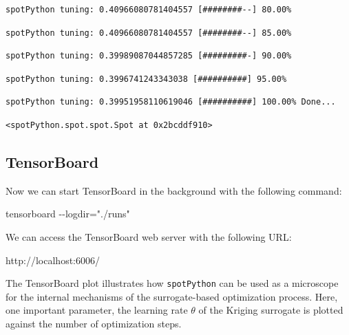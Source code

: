 \documentclass[
  letterpaper,
  DIV=11,
  numbers=noendperiod]{scrreprt}
\newenvironment{Shaded}{\begin{snugshade}}{\end{snugshade}}
\newcommand{\NormalTok}[1]{\textcolor[rgb]{0.00,0.23,0.31}{#1}}
\begin{document}
\begin{verbatim}
spotPython tuning: 0.40966080781404557 [########--] 80.00% 
\end{verbatim}

\begin{verbatim}
spotPython tuning: 0.40966080781404557 [########--] 85.00% 
\end{verbatim}

\begin{verbatim}
spotPython tuning: 0.39989087044857285 [#########-] 90.00% 
\end{verbatim}

\begin{verbatim}
spotPython tuning: 0.3996741243343038 [##########] 95.00% 
\end{verbatim}

\begin{verbatim}
spotPython tuning: 0.39951958110619046 [##########] 100.00% Done...
\end{verbatim}

\begin{verbatim}
<spotPython.spot.spot.Spot at 0x2bcddf910>
\end{verbatim}

\hypertarget{tensorboard-7}{%
\subsection{TensorBoard}\label{tensorboard-7}}

Now we can start TensorBoard in the background with the following
command:

\begin{Shaded}
\begin{Highlighting}[]
\NormalTok{tensorboard {-}{-}logdir="./runs"}
\end{Highlighting}
\end{Shaded}

We can access the TensorBoard web server with the following URL:

\begin{Shaded}
\begin{Highlighting}[]
\NormalTok{http://localhost:6006/}
\end{Highlighting}
\end{Shaded}

The TensorBoard plot illustrates how \texttt{spotPython} can be used as
a microscope for the internal mechanisms of the surrogate-based
optimization process. Here, one important parameter, the learning rate
\(\theta\) of the Kriging surrogate is plotted against the number of
optimization steps.
\end{document}
